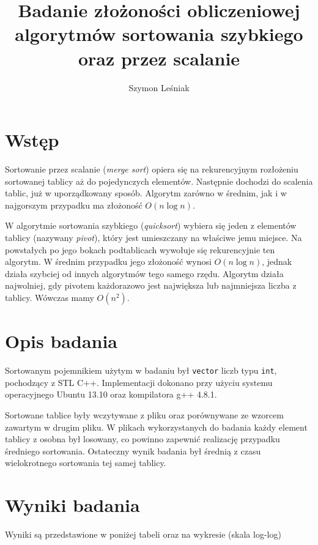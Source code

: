 \documentclass[a4paper,10pt]{article}
\title{Badanie złożoności obliczeniowej algorytmów sortowania szybkiego
oraz przez scalanie}
\author{Szymon Leśniak}
\begin{document}
\maketitle

\section{Wstęp}

\par Sortowanie przez scalanie (\textit{merge sort}) opiera się na 
rekurencyjnym rozłożeniu sortowanej tablicy aż do pojedynczych elementów. 
Następnie dochodzi do scalenia tablic, już w uporządkowany sposób. Algorytm zarówno w średnim,
jak i w najgorszym przypadku ma złożoność \(O(n \log n)\).

\par W algorytmie sortowania szybkiego (\textit{quicksort}) wybiera się jeden
z elementów tablicy (nazywany \textit{pivot}), który jest umieszczany 
na właściwe jemu miejsce. Na powstałych po jego bokach podtablicach wywołuje
się rekurencyjnie ten algorytm. W średnim przypadku jego złożoność wynosi 
\(O(n \log n)\), jednak działa szybciej od innych algorytmów tego samego rzędu.
Algorytm działa najwolniej, gdy pivotem każdorazowo jest największa lub 
najmniejsza liczba z tablicy. Wówczas mamy \(O(n^2)\).

\section{Opis badania}

\par Sortowanym pojemnikiem użytym w badaniu był \verb+vector+ liczb typu
\verb+int+, pochodzący z STL C++. Implementacji 
dokonano przy użyciu systemu operacyjnego Ubuntu 13.10 oraz 
kompilatora g++ 4.8.1.

\par Sortowane tablice były wczytywane z pliku oraz porównywane ze wzorcem
zawartym w drugim pliku. W plikach wykorzystanych do badania każdy 
element tablicy z osobna był losowany, co powinno zapewnić realizację
przypadku średniego sortowania. Ostateczny wynik badania był średnią
z czasu wielokrotnego sortowania tej samej tablicy.

\section{Wyniki badania}

\par Wyniki są przedstawione w poniżej tabeli oraz na wykresie (skala 
log-log) 
\end{document}
